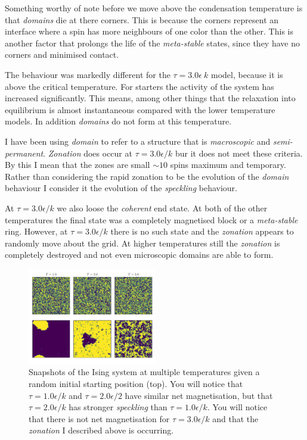 \documentclass[a4paper, twocolumn]{article}
\begin{document}
Something worthy of note before we move above the condensation %
temperature is that \emph{domains} die at there corners. This %
is because the corners represent an interface where a spin has %
more neighbours of one color than the other. This is another %
factor that prolongs the life of the \emph{meta-stable} states, %
since they have no corners and minimised contact. 


The behaviour was markedly different for the \(\tau = 3.0 \epsilon %
\ k\) model, because it is above the critical temperature. %
For starters the activity of the system has increased significantly. %
This means, among other things that the relaxation into equilibrium %
is almost instantaneous compared with the lower temperature models. %
In addition \emph{domains} do not form at this temperature. 


I have been using \emph{domain} to refer to a structure that is %
\emph{macroscopic} and \emph{semi-permanent}. \emph{Zonation} %
does occur at \(\tau = 3.0 \epsilon / k\) bur it does not meet %
these criteria. By this I mean that the zones are small \(\sim 10\) %
spins maximum and temporary. Rather than considering the rapid %
zonation to be the evolution of the \emph{domain} behaviour I %
consider it the evolution of the \emph{speckling} behaviour.


At \(\tau = 3.0 \epsilon / k\) we also loose the \emph{coherent} %
end state. At both of the other temperatures the final state was %
a completely magnetised block or a \emph{meta-stable} ring. %
However, at \(\tau = 3.0 \epsilon / k\) there is no such state %
and the \emph{zonation} appears to randomly move about the grid. %
At higher temperatures still the \emph{zonation} is completely %
destroyed and not even microscopic domains are able to form. 


\begin{figure}
    \centering
    \includegraphics[width=0.5\textwidth]{pub/figures/first_and_last_ising_2d.pdf}
    \caption{Snapshots of the Ising system at multiple temperatures %
        given a random initial starting position (top). You will %
        notice that \(\tau = 1.0 \epsilon / k\) and \(\tau = 2.0 \epsilon %
        /2\) have similar net magnetisation, but that \(\tau = 2.0 %
        \epsilon / k\) has stronger \emph{speckling} than \(\tau = %
        1.0 \epsilon / k\). You will notice that there is not net %
        magnetisation for \(\tau = 3.0 \epsilon / k\) and that the %
        \emph{zonation} I described above is occurring.}
    \label{fig:5}
\end{figure}
\end{document}
